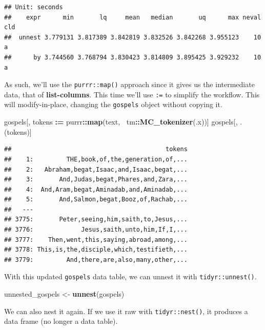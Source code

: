 \documentclass[doc]{apa6}
\newenvironment{Shaded}{\begin{snugshade}}{\end{snugshade}}
\newcommand{\ErrorTok}[1]{\textcolor[rgb]{0.64,0.00,0.00}{\textbf{#1}}}
\newcommand{\KeywordTok}[1]{\textcolor[rgb]{0.13,0.29,0.53}{\textbf{#1}}}
\newcommand{\NormalTok}[1]{#1}
\newcommand{\OperatorTok}[1]{\textcolor[rgb]{0.81,0.36,0.00}{\textbf{#1}}}
\newcommand{\StringTok}[1]{\textcolor[rgb]{0.31,0.60,0.02}{#1}}
\begin{document}
\begin{verbatim}
## Unit: seconds
##    expr      min       lq     mean   median       uq      max neval cld
##  unnest 3.779131 3.817389 3.842819 3.832526 3.842268 3.955123    10   a
##      by 3.744560 3.768794 3.830423 3.814809 3.895425 3.929232    10   a
\end{verbatim}

\noindent As such, we'll use the \texttt{purrr::map()} approach since it gives us the intermediate data, that of \textbf{list-columns}. This time we'll use \texttt{:=} to simplify the workflow. This will modify-in-place, changing the \texttt{gospels} object without copying it.

\begin{Shaded}
\begin{Highlighting}[]
\NormalTok{gospels[, tokens }\OperatorTok{:}\ErrorTok{=}\StringTok{ }\NormalTok{purrr}\OperatorTok{::}\KeywordTok{map}\NormalTok{(text, }\OperatorTok{~}\NormalTok{tm}\OperatorTok{::}\KeywordTok{MC_tokenizer}\NormalTok{(.x))]}
\NormalTok{gospels[, .(tokens)]}
\end{Highlighting}
\end{Shaded}

\begin{verbatim}
##                                          tokens
##    1:         THE,book,of,the,generation,of,...
##    2:   Abraham,begat,Isaac,and,Isaac,begat,...
##    3:       And,Judas,begat,Phares,and,Zara,...
##    4:  And,Aram,begat,Aminadab,and,Aminadab,...
##    5:       And,Salmon,begat,Booz,of,Rachab,...
##   ---                                          
## 3775:       Peter,seeing,him,saith,to,Jesus,...
## 3776:             Jesus,saith,unto,him,If,I,...
## 3777:    Then,went,this,saying,abroad,among,...
## 3778: This,is,the,disciple,which,testifieth,...
## 3779:         And,there,are,also,many,other,...
\end{verbatim}

With this updated \texttt{gospels} data table, we can unnest it with \texttt{tidyr::unnest()}.

\begin{Shaded}
\begin{Highlighting}[]
\NormalTok{unnested_gospels <-}\StringTok{ }\KeywordTok{unnest}\NormalTok{(gospels)}
\end{Highlighting}
\end{Shaded}

\noindent We can also nest it again. If we use it raw with \texttt{tidyr::nest()}, it produces a data frame (no longer a data table).
\end{document}
